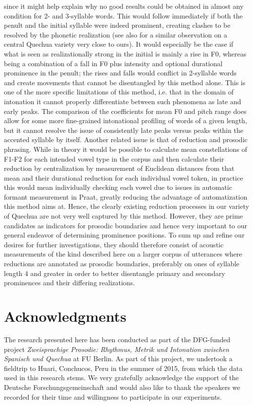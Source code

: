 \documentclass[output=paper]{LSP/langsci}
\begin{document}
since it might help explain why no good results could be obtained in almost any condition for 2- and 3-syllable words. This would follow immediately if both the penult and the initial syllable were indeed prominent, creating clashes to be resolved by the phonetic realization (see also \citealt{Hintz2006} for a similar observation on a central Quechua variety very close to ours). It would especially be the case if what is seen as realizationally strong in the initial is mainly a rise in F0, whereas being a combination of a fall in F0 plus intensity and optional durational prominence in the penult; the rises and falls would conflict in 2-syllable words and create movements that cannot be disentangled by this method alone. This is one of the more specific limitations of this method, i.e. that in the domain of intonation it cannot properly differentiate between such phenomena as late and early peaks. The comparison of the coefficients for mean F0 and pitch range does allow for some more fine-grained intonational profiling of words of a given length, but it cannot resolve the issue of consistently late peaks versus peaks within the accented syllable by itself. Another related issue is that of reduction and prosodic phrasing. While in theory it would be possible to calculate mean constellations of F1-F2 for each intended vowel type in the corpus and then calculate their reduction by centralization by measurement of Euclidean distances from that mean and their durational reduction for each individual vowel token, in practice this would mean individually checking each vowel due to issues in automatic formant measurement in {Praat}, greatly reducing the advantage of automatization this method aims at. Hence, the clearly existing reduction processes in our variety of Quechua are not very well captured by this method. However, they are prime candidates as indicators for prosodic boundaries and hence very important to our general endeavor of determining prominence positions. To sum up and refine our desires for further investigations, they should therefore consist of acoustic measurements of the kind described here on a larger corpus of utterances where reductions are annotated as prosodic boundaries, preferably on ones of syllable length 4 and greater in order to better disentangle primary and secondary prominences and their differing realizations.    

\section*{Acknowledgments}
The research presented here has been conducted as part of the DFG-funded project \textit{Zwei\-sprachige Prosodie: Rhythmus, Metrik und Intonation zwischen Spanisch und Quechua} at FU Berlin. As part of this project, we undertook a fieldtrip to Huari, Conchucos, Peru in the summer of 2015, from which the data used in this research stems. We very gratefully acknowledge the support of the Deutsche Forschungsgemeinschaft and would also like to thank the speakers we recorded for their time and willingness to participate in our experiments.

{\sloppy
\printbibliography[heading=subbibliography,notkeyword=this]
}
\end{document}
